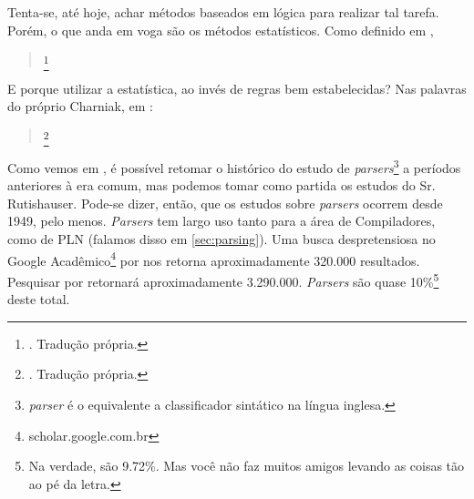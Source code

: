 Tenta-se, até hoje, achar métodos baseados em lógica para realizar tal tarefa. Porém, o que anda em voga são os métodos estatísticos. Como definido em ,
\begin{quote}
    \footnote{. Tradução própria.}
\end{quote}
E porque utilizar a estatística, ao invés de regras bem estabelecidas? Nas palavras do próprio Charniak, em \cite[p~89]{Moor2006DartmouthIA}:
\begin{quote}
    \footnote{. Tradução própria.}
\end{quote}
Como vemos em \cite{kegler2019parsing}, é possível retomar o histórico do estudo de \textit{parsers}\footnote{\textit{\textit{parser}} é o equivalente a classificador sintático na língua inglesa.} a períodos anteriores à era comum,
mas podemos tomar como partida os estudos do Sr. Rutishauser. Pode-se dizer, então, que os estudos sobre \textit{parsers} ocorrem desde 1949, pelo menos.
\textit{Parsers} tem largo uso tanto para a área de Compiladores, como de PLN (falamos disso em \ref{sec:parsing}). Uma busca despretensiosa no Google Acadêmico\footnote{scholar.google.com.br} por  nos retorna aproximadamente 320.000 resultados. Pesquisar por  retornará aproximadamente 3.290.000. \textit{Parsers} são quase 10\%\footnote{Na verdade, são 9.72\%. Mas você não faz muitos amigos levando as coisas tão ao pé da letra.} deste total.


